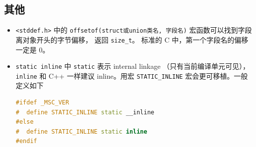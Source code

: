 \subsection{其他}
\begin{itemize}
\item \verb`<stddef.h>` 中的 \verb`offsetof(struct或union类名, 字段名)` 宏函数可以找到字段离对象开头的字节偏移， 返回 \verb`size_t`。 标准的 C 中，第一个字段名的偏移一定是 0。
\item \verb`static inline` 中 \verb`static` 表示 internal linkage （只有当前编译单元可见）， \verb`inline` 和 C++ 一样建议 inline。用宏 \verb`STATIC_INLINE` 宏会更可移植。一般定义如下
\begin{lstlisting}[language=cpp]
#ifdef _MSC_VER
#  define STATIC_INLINE static __inline
#else
#  define STATIC_INLINE static inline
#endif
\end{lstlisting}
\end{itemize}

